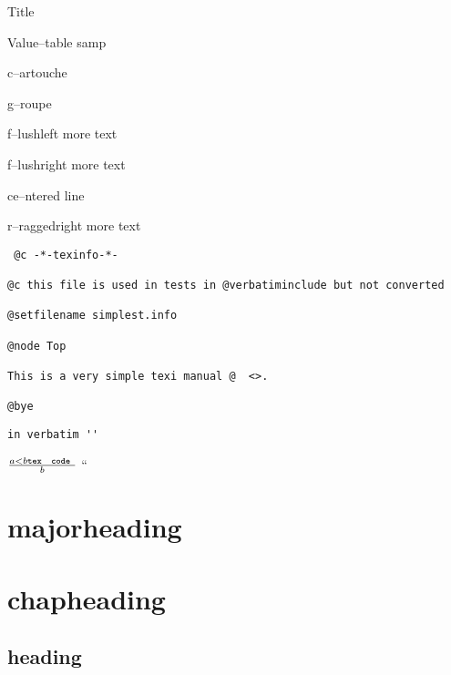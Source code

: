 \documentclass{book}
\newcommand\GNUTexinfotablestylesamp[1]{\ifstrempty{#1}{}{`\texttt{#1}'}}%
\newcommand{\GNUTexinfoplaceholder}[1]{}
\newcommand{\GNUTexinfonopagebreakheading}[2]{\let\clearpage\relax \let\cleardoublepage\relax \let\thispagestyle\GNUTexinfoplaceholder #1{#2}}
\begin{document}
\begin{titlepage}
\begin{description}[format=\GNUTexinfotablestylesamp]
\item[] Title
\item[a{-}{-}samp]
\item[a2{-}{-}samp]
Value--table samp
\end{description}

\begin{mdframed}[style=GNUTexinfocartouche]
c--artouche
\end{mdframed}

g--roupe

f--lushleft
more text

f--lushright
more text

\begin{center}
ce--ntered line
\end{center}

\begin{flushleft}
r--raggedright
more text
\end{flushleft}

\begin{verbatim}
 @c -*-texinfo-*-

@c this file is used in tests in @verbatiminclude but not converted

@setfilename simplest.info

@node Top

This is a very simple texi manual @  <>.

@bye
\end{verbatim}

\begin{verbatim}
in verbatim ''
\end{verbatim}





$\frac{a < b \texttt{tex \hbox{ code }}}{b}$ ``

\GNUTexinfonopagebreakheading{\chapter*}{majorheading}

\GNUTexinfonopagebreakheading{\chapter*}{chapheading}

\GNUTexinfonopagebreakheading{\section*}{heading}


\end{titlepage}
\end{document}
